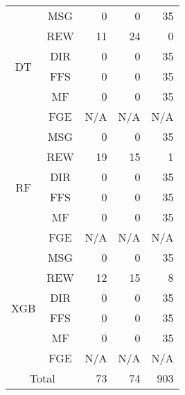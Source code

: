 \begin{table}[htbp]
\begin{center}
\begin{tabular}{|c|c|r|r|r|}
                \multirow{6}{*}{DT} & MSG & 0 & 0 & 35 \\
                \cline{2-5}
                    & REW & 11 & 24 & 0 \\
                \cline{2-5}
                    & DIR & 0 & 0 & 35 \\
                \cline{2-5}
                    & FFS &  0 & 0 & 35 \\
                \cline{2-5}
                    & MF & 0 & 0 & 35 \\
                \cline{2-5}
                    & FGE & N/A & N/A & N/A \\
                \cline{1-5}

                \multirow{6}{*}{RF} & MSG & 0 & 0 & 35 \\
                \cline{2-5}
                    & REW & 19 & 15 & 1 \\
                \cline{2-5}
                    & DIR & 0 & 0 & 35 \\
                \cline{2-5}
                    & FFS &  0 & 0 & 35 \\
                \cline{2-5}
                    & MF & 0 & 0 & 35 \\
                \cline{2-5}
                    & FGE & N/A & N/A & N/A \\
                \cline{1-5}
                
                \multirow{6}{*}{XGB} & MSG & 0 & 0 & 35 \\
                \cline{2-5}
                    & REW & 12 & 15 & 8 \\
                \cline{2-5}
                    & DIR & 0 & 0 & 35 \\
                \cline{2-5}
                    & FFS &  0 & 0 & 35 \\
                \cline{2-5}
                    & MF & 0 & 0 & 35 \\
                \cline{2-5}
                    & FGE & N/A & N/A & N/A \\
                \cline{1-5}
                
                \multicolumn{2}{|c|}{Total} & 73 & 74 & 903 \\
                \hline
            \end{tabular}
    \end{center}
\end{table}